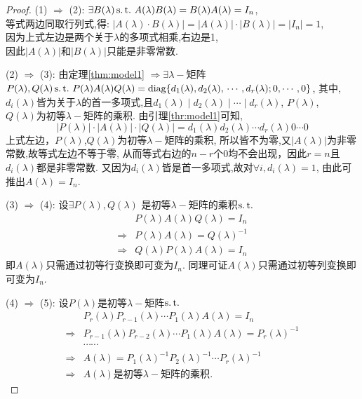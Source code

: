 \begin{proof}
  (1) $\Longrightarrow$ (2): 
  $\exists B(\lambda) \operatorname{s.t.{}} A(\lambda)B(\lambda)=B(\lambda)A(\lambda)=I_n$,\\
  等式两边同取行列式,得:
  $|A(\lambda)\cdot B(\lambda)|=|A(\lambda)|\cdot |B(\lambda)|=|I_n|=1$,\\
  因为上式左边是两个关于$\lambda$的多项式相乘,右边是1,\\
  因此$|A(\lambda)|$和$|B(\lambda)|$只能是非零常数.

  (2) $\Longrightarrow$ (3): 由定理\ref{thm:model1}
  $\Longrightarrow \exists \lambda-$矩阵$P(\lambda),Q(\lambda)
  \operatorname{s.t.{}} P(\lambda)A(\lambda)Q(\lambda)=
  \operatorname{diag} \{d_1(\lambda),d_2(\lambda),\\\cdots,d_r(\lambda);0,\cdots,0\}$,
  其中, $d_i(\lambda)$皆为关于$\lambda$的首一多项式,且$d_1(\lambda)\mid
  d_2(\lambda) \mid \cdots \mid d_r(\lambda)$,
  $P(\lambda)$,\\$Q(\lambda)$为初等$\lambda-$矩阵的乘积.
  由引理\ref{thr:model1}可知,
  \[|P(\lambda)|\cdot|A(\lambda)|\cdot|Q(\lambda)|=
    d_1(\lambda)d_2(\lambda)\cdots d_r(\lambda)0\cdots 0\]
  上式左边，$P(\lambda)$,$Q(\lambda)$为初等$\lambda-$矩阵的乘积,
  所以皆不为零,又$|A(\lambda)|$为非零常数,故等式左边不等于零,
  从而等式右边的$n-r$个0均不会出现，因此$r=n$且$d_i(\lambda)$都是非零常数.
  又因为$d_i(\lambda)$皆是首一多项式,故对$\forall i, d_i(\lambda)=1$,
  由此可推出$A(\lambda)=I_n$.

  (3) $\Longrightarrow$ (4): 设$\exists P(\lambda), Q(\lambda)$
  是初等$\lambda-$矩阵的乘积$\operatorname{s.t.{}}$
  \begin{align*}
    & P(\lambda)A(\lambda)Q(\lambda)=I_n\\
      \Longrightarrow & P(\lambda)A(\lambda)=Q(\lambda)^{-1}\\
    \Longrightarrow & Q(\lambda)P(\lambda)A(\lambda)=I_n
  \end{align*}
  即$A(\lambda)$只需通过初等行变换即可变为$I_n$.
  同理可证$A(\lambda)$只需通过初等列变换即可变为$I_n$.

  (4) $\Longrightarrow$ (5): 设$P(\lambda)$是初等$\lambda-$矩阵$\operatorname{s.t.{}}$
  \begin{align*}
    & P_r(\lambda)P_{r-1}(\lambda)\cdots P_1(\lambda)A(\lambda)=I_n\\
    \Longrightarrow & P_{r-1}(\lambda)P_{r-2}(\lambda)\cdots P_1(\lambda)A(\lambda)=P_r(\lambda)^{-1}\\
    & \cdots\cdots\\
    \Longrightarrow & A(\lambda) = P_1(\lambda)^{-1}P_2(\lambda)^{-1}\cdots P_r(\lambda)^{-1}\\
    \Longrightarrow & A(\lambda)\text{是初等}\lambda-\text{矩阵的乘积}.
  \end{align*}


\end{proof}

